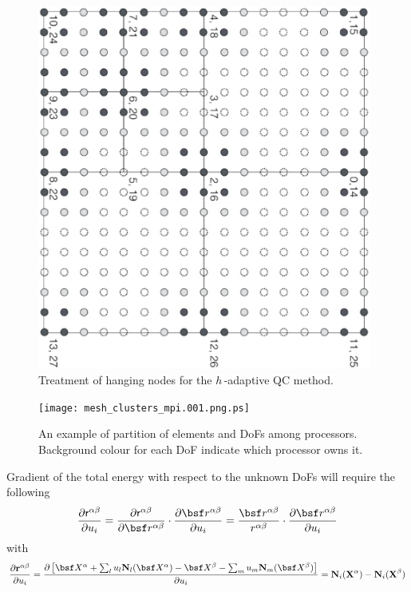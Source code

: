 \documentclass[a4paper,10pt]{article}
\def\gz  #1{           \mbox{$\mathbf{#1}$}}
\def\msf  #1{           \mbox{\!\!      $\sf #1$}}
\begin{document}
\begin{figure}[!ht]
   \centering
    \includegraphics[angle=90,width=0.98\textwidth]{mesh_clusters.001.png.ps}
    \caption{
        Treatment of hanging nodes for the $h$\,-adaptive QC method.
    }
    \label{fig:mesh_clusters}
\end{figure}

\begin{figure}[!ht]
    \centering
    \texttt{[image: mesh\_clusters\_mpi.001.png.ps]}
    \caption{
        An example of partition of elements and DoFs among processors. Background colour for each DoF indicate which processor owns it.
    }
    \label{fig:mesh_mpi}
\end{figure}


Gradient of the total energy with respect to the unknown DoFs will require the following
\begin{align}
\frac{\partial \msf r^{\alpha \beta}}{\partial u_i} = \frac{\partial \msf r^{\alpha \beta}}{\partial \bsf r^{\alpha\beta}} \cdot \frac{\partial \bsf r^{\alpha\beta}}{\partial u_i} = \frac{\bsf r^{\alpha\beta}}{r^{\alpha\beta}} \cdot \frac{\partial \bsf r^{\alpha\beta}}{\partial u_i}
\end{align}
with
\begin{align}
\frac{\partial \gz r^{\alpha\beta}}{\partial u_i} = \frac{\partial\left[\bsf X^\alpha + \sum_l u_l \gz N_l(\bsf X^\alpha) - \bsf X^\beta - \sum_m u_m \gz N_m(\bsf X^\beta)\right]}{\partial u_i} = \gz N_i (\gz X^\alpha) - \gz N_i (\gz X^\beta)
\end{align}
\end{document}
